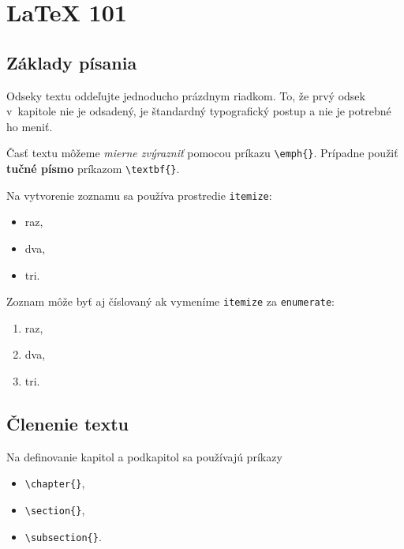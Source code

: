 
\chapter{\LaTeX{} 101}\label{app:latex.101}

\section{Základy písania}

Odseky textu oddeľujte jednoducho prázdnym riadkom. To, že prvý odsek v~kapitole nie je odsadený, je štandardný typografický postup a nie je potrebné ho meniť.

Časť textu môžeme \emph{mierne zvýrazniť} pomocou príkazu \verb|\emph{}|. Prípadne použiť \textbf{tučné písmo} príkazom \verb|\textbf{}|.

Na vytvorenie zoznamu sa používa prostredie \texttt{itemize}:

\begin{itemize}
  \item raz,
  \item dva,
  \item tri.
\end{itemize}

Zoznam môže byť aj číslovaný ak vymeníme \texttt{itemize} za \texttt{enumerate}:

\begin{enumerate}
  \item raz,
  \item dva,
  \item tri.
\end{enumerate}


\section{Členenie textu}

Na definovanie kapitol a podkapitol sa používajú príkazy
\begin{itemize}
  \item \verb|\chapter{}|,
  \item \verb|\section{}|,
  \item \verb|\subsection{}|.
\end{itemize}

